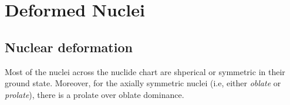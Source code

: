 \chapter{Deformed Nuclei}

\section{Nuclear deformation}

Most of the nuclei across the nuclide chart are shperical or symmetric in their ground state. Moreover, for the axially symmetric nuclei (i.e, either \emph{oblate} or \emph{prolate}), there is a prolate over oblate dominance.